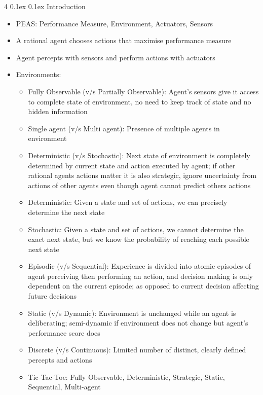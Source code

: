 \documentclass[10pt, landscape]{article}
\makeatletter
\renewcommand{\section}{\@startsection{section}{1}{0mm}%
  {0.1ex} %
  {0.1ex} %
  {\normalfont\large\bfseries}}
\makeatother
\begin{document}
\begin{multicols*}{4}
\section{Introduction}
\begin{itemize}
    \item PEAS: Performance Measure, Environment, Actuators, Sensors
    \item A rational agent chooses actions that maximise performance measure
    \item Agent percepts with sensors and perform actions with actuators
    \item Environments:
    \begin{itemize}
        \item Fully Observable (v/s Partially Observable): Agent's sensors give it access to complete state of environment, no need to keep track of state and no hidden information
        \item Single agent (v/s Multi agent): Presence of multiple agents in environment
        \item Deterministic (v/s Stochastic): Next state of environment is completely determined by current state and action executed by agent; if other rational agents actions matter it is also strategic, ignore uncertainty from actions of other agents even though agent cannot predict others actions
        \item Deterministic: Given a state and set of actions, we can precisely determine the next state
        \item Stochastic: Given a state and set of actions, we cannot determine the exact next state, but we know the probability of reaching each possible next state
        \item Episodic (v/s Sequential): Experience is divided into atomic episodes of agent perceiving then performing an action, and decision making is only dependent on the current episode; as opposed to current decision affecting future decisions
        \item Static (v/s Dynamic): Environment is unchanged while an agent is deliberating; semi-dynamic if environment does not change but agent's performance score does
        \item Discrete (v/s Continuous): Limited number of distinct, clearly defined percepts and actions
        \item Tic-Tac-Toe: Fully Observable, Deterministic, Strategic, Static, Sequential, Multi-agent
    \end{itemize}
\end{itemize}


\end{multicols*}
\end{document}
